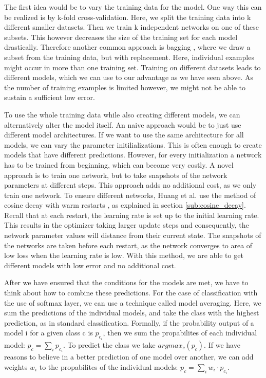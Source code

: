 The first idea would be to vary the training data for the model. One way this
can be realized is by k-fold cross-validation. Here, we split the training data
into k different smaller datasets. Then we train k independent networks on one
of these subsets. This however decreases the size of the training set for each
model drastically. Therefore another common approach is bagging
\cite{breiman1996bagging}, where we draw a subset from the training data, but
with replacement. Here, individual examples might occur in more than one
training set. Training on different datasets leads to different models, which we
can use to our advantage as we have seen above. As the number of training
examples is limited however, we might not be able to sustain a sufficient low
error.

To use the whole training data while also creating different models, we can
alternatively alter the model itself. An naive approach would be to just use
different model architectures. If we want to use the same architecture for all
models, we can vary the parameter initilializations. This is often enough to
create models that have different predictions. However, for every initialization
a network has to be trained from beginning, which can become very costly. A
novel approach is to train one network, but to take snapshots of the network
parameters at different steps. This approach adds no additional cost, as we only
train one network. To ensure different networks, Huang et al.
\cite{huang2017snapshot} use the method of cosine decay with warm restarts
\cite{loshchilov2016sgdr}, as explained in section \ref{sub:cosine_decay}.
Recall that at each restart, the learning rate is set up to the initial learning
rate. This results in the optimizer taking larger update steps and consequently,
the network parameter values will distance from their current state. The
snapshots of the networks are taken before each restart, as the network
converges to area of low loss when the learning rate is low. With this method,
we are able to get different models with low error and no additional cost.

After we have ensured that the conditions for the models are met, we have to
think about how to combine these predictions. For the case of classification
with the use of softmax layer, we can use a technique called model averaging.
Here, we sum the predictions of the individual models, and take the class with
the highest prediction, as in standard classification. Formally, if the
probability output of a model i for a given class c is $p_{c_i}$, then we sum
the propabilites of each individual model: $p_c = \sum_i p_{c_i}$. To predict
the class we take $argmax_c(p_c)$. If we have reasons to believe in a better
prediction of one model over another, we can add weights $w_i$ to the
propabilites of the individual models: $p_c = \sum_i w_i \cdot p_{c_i}$.


\begin{comment}
Further aspects that could be included:
- classififcation in general
- cross entropy loss and loss functions
- gradient descent


openquestions:
where generalization gap
areas ofsame loss better
expand sgd warm restart


\end{comment}